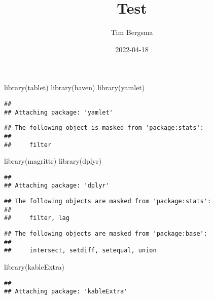 \documentclass[
]{article}
\title{Test}
\author{Tim Bergsma}
\date{2022-04-18}
\newenvironment{Shaded}{\begin{snugshade}}{\end{snugshade}}
\newcommand{\FunctionTok}[1]{\textcolor[rgb]{0.00,0.00,0.00}{#1}}
\newcommand{\NormalTok}[1]{#1}
\begin{document}
\maketitle

{
\setcounter{tocdepth}{2}
\tableofcontents
}
\begin{Shaded}
\begin{Highlighting}[]
\FunctionTok{library}\NormalTok{(tablet)}
\FunctionTok{library}\NormalTok{(haven)}
\FunctionTok{library}\NormalTok{(yamlet)}
\end{Highlighting}
\end{Shaded}

\begin{verbatim}
## 
## Attaching package: 'yamlet'
\end{verbatim}

\begin{verbatim}
## The following object is masked from 'package:stats':
## 
##     filter
\end{verbatim}

\begin{Shaded}
\begin{Highlighting}[]
\FunctionTok{library}\NormalTok{(magrittr)}
\FunctionTok{library}\NormalTok{(dplyr)}
\end{Highlighting}
\end{Shaded}

\begin{verbatim}
## 
## Attaching package: 'dplyr'
\end{verbatim}

\begin{verbatim}
## The following objects are masked from 'package:stats':
## 
##     filter, lag
\end{verbatim}

\begin{verbatim}
## The following objects are masked from 'package:base':
## 
##     intersect, setdiff, setequal, union
\end{verbatim}

\begin{Shaded}
\begin{Highlighting}[]
\FunctionTok{library}\NormalTok{(kableExtra)}
\end{Highlighting}
\end{Shaded}

\begin{verbatim}
## 
## Attaching package: 'kableExtra'
\end{verbatim}
\end{document}
